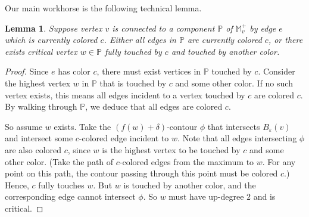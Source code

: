\documentclass[11pt]{article}
\newcommand{\ignore}[1]{}
\newtheorem{lemma}[theorem]{Lemma}
\newtheorem{claim}[theorem]{Claim}
\theoremstyle{definition}
\newcommand{\cC}{{\cal C}}
\newcommand{\cJ}{{\cal J}}
\newcommand{\MM}{\mathbb{M}}
\newcommand{\PP}{\mathbb{P}}
\newcommand{\eps}{\varepsilon}
\newcommand{\Thm}[1]{\hyperref[thm:#1]{Theorem~\ref*{thm:#1}}} %
\newcommand{\fcol}{full}
\newcommand{\h}{att}
\newcommand{\pal}{P}
\begin{document}
\ignore{
\begin{claim} \label{clm:process} Assume the invariant. Any vertex with a non-increasing path to some $\h(c)$
for $c \in \pal$ has been processed.
\end{claim}

\begin{proof} This is a direct consequence of \Thm{carr-mono}, which relates monotone paths in $\MM$ to $\cC(\MM)$.
Since the subtree of $\cJ(\MM)$ (which is basically the subtree of $\cC(\MM)$) rooted at $\h(c)$ 
has been found, all vertices in this subtree must be processed. These are all the vertices with non-increasing paths
to $\h(c)$ in $\cC(\MM)$, which by \Thm{carr-mono} is the same as those in $\cC(\MM)$.
\end{proof}
}

Our main workhorse is the following technical lemma. 

\begin{lemma} \label{lem:full} Suppose vertex $v$ is connected to a component $\PP$ of $\MM^+_v$
by edge $e$ which is currently colored $c$. Either all edges in $\PP$ are currently colored $c$, or there
exists critical vertex $w \in \PP$ fully touched by $c$ and touched by another color.
%
\end{lemma}

\begin{proof} Since $e$ has color $c$,
there must exist vertices in $\PP$ touched by $c$. Consider the highest
vertex $w$ in $\PP$ that is touched by $c$ and some other color. If no such vertex exists,
this means all edges incident to a vertex touched by $c$ are colored $c$. By walking through
$\PP$, we deduce that all edges are colored $c$. 

So assume $w$ exists. Take the $(f(w)+\delta)$-contour $\phi$ that intersects $B_\eps(v)$
and intersect some $c$-colored edge incident to $w$. Note that all edges intersecting $\phi$ are also colored $c$,
since $w$ is the highest vertex to be touched by $c$ and some other color. (Take the path of $c$-colored
edges from the maximum to $w$. For any point on this path, the contour passing through this point must
be colored $c$.) Hence, $c$ fully touches $w$. 
But $w$ is touched by another color, and the corresponding edge cannot intersect $\phi$. So $w$
must have up-degree $2$ and is critical.
\end{proof}
\end{document}
